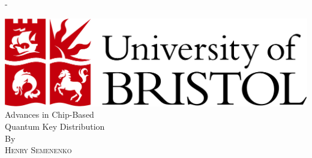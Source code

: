 %
%
% 
%
%
\begin{titlingpage}
\begin{SingleSpace}
\calccentering{\unitlength} 
\begin{adjustwidth*}{\unitlength}{-\unitlength}
\vspace*{0mm}
\begin{center}
\includegraphics[scale=0.25]{logos/bristollogo_colour}\\
\vspace{25mm}
{\HUGE Advances in Chip-Based\\Quantum Key Distribution }\\[4mm]
\vspace{25mm}
{\large By}\\
\vspace{6.5mm}
{\large\textsc{Henry Semenenko}}\\

\end{center}
\end{adjustwidth*}
\end{SingleSpace}
\end{titlingpage}
